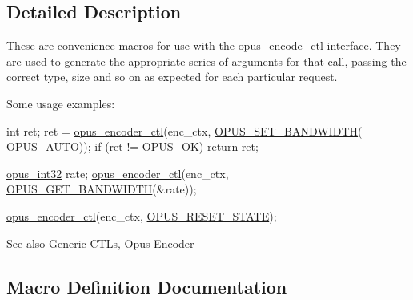 \subsection{Detailed Description}
These are convenience macros for use with the {\ttfamily opus\+\_\+encode\+\_\+ctl} interface. They are used to generate the appropriate series of arguments for that call, passing the correct type, size and so on as expected for each particular request.

Some usage examples\+:


\begin{DoxyCode}
\textcolor{keywordtype}{int} ret;
ret = \hyperlink{group__opus__encoder_ga88cb327d8f7d6a96c7d2d0b8461512e6}{opus\_encoder\_ctl}(enc\_ctx, \hyperlink{group__opus__encoderctls_ga0178dabe5526d5b0667d81489cc93791}{OPUS\_SET\_BANDWIDTH}(
      \hyperlink{group__opus__ctlvalues_ga1c5b3244b018ff4548d2d6bffa418472}{OPUS\_AUTO}));
\textcolor{keywordflow}{if} (ret != \hyperlink{group__opus__errorcodes_gaa44cf8a185e1b5cb940ef63eb4f02d21}{OPUS\_OK}) \textcolor{keywordflow}{return} ret;

\hyperlink{opus__types_8h_aa4d309d6f80b99dbabebc8f98879ab9a}{opus\_int32} rate;
\hyperlink{group__opus__encoder_ga88cb327d8f7d6a96c7d2d0b8461512e6}{opus\_encoder\_ctl}(enc\_ctx, \hyperlink{group__opus__genericctls_ga29db1d9b5e670debec54d1163ad2ec62}{OPUS\_GET\_BANDWIDTH}(&rate));

\hyperlink{group__opus__encoder_ga88cb327d8f7d6a96c7d2d0b8461512e6}{opus\_encoder\_ctl}(enc\_ctx, \hyperlink{group__opus__genericctls_gadc74e4fa8bcdf9994187d52d92207337}{OPUS\_RESET\_STATE});
\end{DoxyCode}


\begin{DoxySeeAlso}{See also}
\hyperlink{group__opus__genericctls}{Generic C\+T\+Ls}, \hyperlink{group__opus__encoder}{Opus Encoder} 
\end{DoxySeeAlso}


\subsection{Macro Definition Documentation}
\mbox{\label{group__opus__encoderctls_ga062ebbc209caf6832fe4a309a459fd4c}} 
